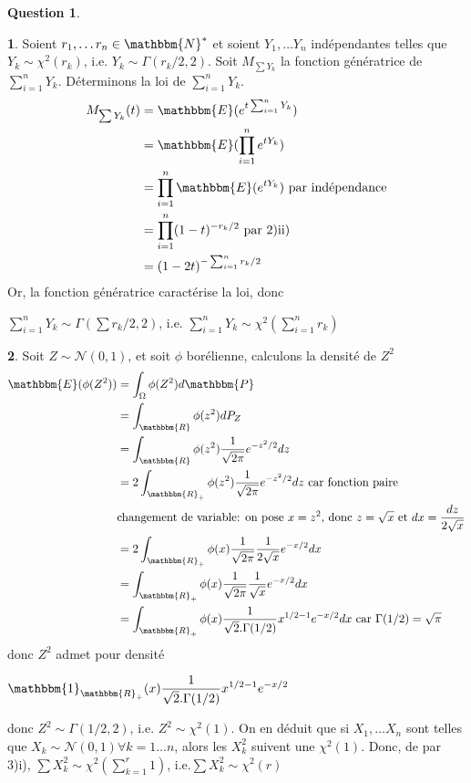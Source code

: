 \documentclass[12pt]{article}
\newcommand{\R}{\mathbbm{R}}
\newcommand{\N}{\mathbbm{N}}
\newcommand{\1}{\mathbbm{1}}
\newcommand{\E}{\mathbbm{E}}
\newcommand{\Prob}{\mathbbm{P}}
\newcommand{\Nc}{\mathcal{N}}
\theoremstyle{definition}\newtheorem{defn}{Définition}
\theoremstyle{definition}\newtheorem{exm}{Exemple}
\theoremstyle{definition}\newtheorem{rem}{Remarque}
\theoremstyle{definition}\newtheorem{algo}{Algorithme}
\theoremstyle{remark}\newtheorem{exo}{Exercice}
\theoremstyle{remark}\newtheorem{nota}{Notation}
\theoremstyle{definition}\newtheorem{1q}{Question}
\theoremstyle{definition}\newtheorem{2q}{Question}
\theoremstyle{definition}\newtheorem{3q}{Question}
\theoremstyle{definition}\newtheorem{4q}{Question}
\theoremstyle{definition}\newtheorem{2qs1}{}
\theoremstyle{definition}\newtheorem{2qs2}{}
\theoremstyle{definition}\newtheorem{2qs3}{}
\theoremstyle{definition}\newtheorem{2qs4}{}
\theoremstyle{definition}\newtheorem{4qs2}{}
\theoremstyle{definition}\newtheorem{4qs3}{}
\begin{document}
\begin{2q}


\begin{2qs3}
Soient $r_1, \ldots r_n \in \N^*$ et soient $Y_1, \ldots Y_n$ indépendantes telles que $Y_k \sim \chi^2(r_k)$, i.e. $Y_k\sim \Gamma(r_k/2, 2)$. \newline
Soit $M_{\sum Y_k}$ la fonction génératrice de $\displaystyle\sum_{i=1}^n Y_k$. Déterminons la loi de $\sum_{i=1}^n Y_k$.
\begin{align*}
M_{\sum Y_k}(t)&= \E(e^{t\sum_{i=1}^n Y_k})\\
&= \E(\prod_{i=1}^n e^{tY_k})\\
&= \prod_{i=1}^n\E(e^{tY_k}) \text{  par indépendance}\\
&= \prod_{i=1}^n(1-t)^{-r_k/2} \text{  par 2)ii)}\\
&= (1-2t)^{-\sum_{i=1}^n r_k/2}
\end{align*}
Or, la fonction génératrice caractérise la loi, donc
\begin{center} $\displaystyle\sum_{i=1}^n Y_k\sim \Gamma\left(\sum r_k/2,2\right)$, i.e. $\displaystyle\sum_{i=1}^n Y_k\sim \chi^2\left(\sum_{i=1}^n r_k\right)$\end{center}
\end{2qs3}

\begin{2qs3}
Soit $Z\sim \Nc(0,1)$, et soit $\phi$ borélienne, calculons la densité de $Z^2$
\begin{align*}
\E(\phi(Z^2)) &= \int_{\Omega}\phi(Z^2)d\Prob \\
&=  \int_{\R}\phi (z^2)dP_Z \\
&=  \int_{\R}\phi(z^2)\frac{1}{\sqrt{2\pi}}e^{-z^2/2}dz\\
&= 2\int_{\R_+}\phi(z^2)\frac{1}{\sqrt{2\pi}}e^{-z^2/2}dz \text{  car fonction paire}\\
&\text{changement de variable: on pose $x=z^2$, donc $z=\sqrt{x}$ et $dx = \frac{dz}{2\sqrt{x}}$}\\
&= 2\int_{\R_+}\phi(x)\frac{1}{\sqrt{2\pi}}\frac{1}{2\sqrt{x}}e^{-x/2}dx\\
&= \int_{\R_+}\phi(x)\frac{1}{\sqrt{2\pi}}\frac{1}{\sqrt{x}}e^{-x/2}dx\\
&= \int_{\R_+}\phi(x)\frac{1}{\sqrt{2}.\Gamma(1/2)}x^{1/2-1}e^{-x/2}dx\text{  car $\Gamma(1/2)=\sqrt{\pi}$}\\
\end{align*}
donc $Z^2$ admet pour densité
\begin{center} $\displaystyle\1_{\R_+}(x)\frac{1}{\sqrt{2}.\Gamma(1/2)}x^{1/2-1}e^{-x/2}$\end{center}
donc $Z^2 \sim \Gamma(1/2,2)$, i.e. $Z^2\sim \chi^2(1)$.\newline
On en déduit que si $X_1, \ldots X_n$ sont telles que $X_k\sim\Nc(0,1)\forall k =1\ldots n$, alors les $X_k^2$ suivent une $\chi^2(1)$.\newline
Donc, de par 3)i), $\displaystyle\sum X_k^2 \sim \chi^2\left(\sum_{k=1}^r 1\right)$, i.e.$\displaystyle\sum X_k^2 \sim \chi^2(r)$
\end{2qs3}


\end{2q}
\end{document}
